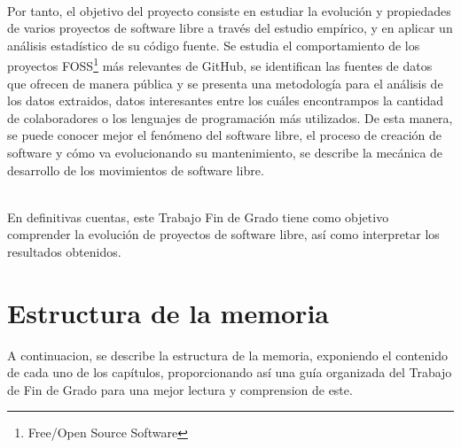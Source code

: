 \documentclass[a4paper, 12pt]{book}
\begin{document}
\\Por tanto, el objetivo del proyecto consiste en estudiar la evolución y propiedades de varios proyectos de software libre a través del estudio
empírico, y en aplicar un análisis estadístico de su código fuente.
Se estudia el comportamiento de los proyectos FOSS\footnote{Free/Open Source Software} más relevantes de GitHub, se identifican las fuentes de datos
que ofrecen de manera pública y se presenta una metodología para el análisis de los datos extraidos, datos interesantes entre los cuáles encontrampos 
la cantidad de colaboradores o los lenguajes de programación más utilizados.
De esta manera, se puede conocer mejor el fenómeno del software libre, el proceso de creación de software y cómo va evolucionando su mantenimiento,
se describe la mecánica de desarrollo de los movimientos de software libre.

\\En definitivas cuentas, este Trabajo Fin de Grado tiene como objetivo comprender la evolución de proyectos de software libre, así como interpretar los resultados obtenidos.

\section{Estructura de la memoria}
\label{sec:estructura}

A continuacion, se describe la estructura de la memoria, exponiendo el contenido de cada uno de los capítulos, proporcionando así
una guía organizada del Trabajo de Fin de Grado para una mejor lectura y comprension de este.
\end{document}
